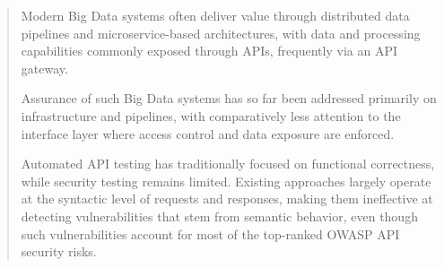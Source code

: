 \documentclass[
]{ceurart}
\begin{document}
\address[1]{Dipartimento di Informatica, Università degli Studi di Milano, Via Celoria 18, Milano, 20133, Italia}
\address[2]{Moon Cloud srl, via Chiodo 8, Crema (CR)}


\begin{abstract}
  Modern Big Data systems often deliver value through distributed data pipelines and microservice-based architectures, with data and processing capabilities commonly exposed through APIs, frequently via an API gateway.

  Assurance of such Big Data systems has so far been addressed primarily on infrastructure and pipelines, with comparatively less attention to the interface layer where access control and data exposure are enforced.


  Automated API testing has traditionally focused on functional correctness, while security testing remains limited. Existing approaches largely operate at the syntactic level of requests and responses, making them ineffective at detecting vulnerabilities that stem from semantic behavior, even though such vulnerabilities account for most of the top-ranked OWASP API security risks.



\end{abstract}
\end{document}
